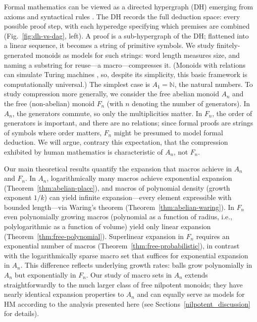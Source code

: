 \documentclass[12pt]{amsart}
\theoremstyle{definition}
\theoremstyle{remark}
\begin{document}
Formal mathematics can be viewed as a directed hypergraph (DH) emerging from axioms and syntactical rules \cite{BDF}.
The DH records the full deduction space: every possible proof step, with each hyperedge specifying which premises are combined (Fig.~\ref{fig:dh-vs-dag}, left).
A proof is a sub-hypergraph of the DH; flattened into a linear sequence, it becomes a string of primitive symbols.
We study finitely-generated monoids as models for such strings: word length measures size, and naming a substring for reuse---a macro---compresses it.
(Monoids with relations can simulate Turing machines \cite{Post}, so, despite its simplicity, this basic framework is computationally universal.)
The simplest case is $A_1 = \mathbb{N}$, the natural numbers. 
To study compression more generally, we consider the free abelian monoid $A_n$ and the free (non-abelian) monoid $F_n$ (with $n$ denoting the number of generators).
In $A_n$, the generators commute, so only the multiplicities matter.
In $F_n$, the order of generators is important, and there are no relations; since formal proofs are strings of symbols where order matters, $F_n$ might be presumed to model formal deduction.
We will argue, contrary this expectation, that the compression exhibited by human mathematics is characteristic of $A_n$, not $F_n$.

Our main theoretical results quantify the expansion that macros achieve in $A_n$ and $F_n$.
In $A_n$, logarithmically many macros achieve exponential expansion (Theorem~\ref{thm:abelian-place}), and macros of polynomial density (growth exponent $1/k$) can yield infinite expansion---every element expressible with bounded length---via Waring's theorem (Theorem~\ref{thm:abelian-waring}).
In $F_n$ even polynomially growing macros (polynomial as a function of radius, i.e., polylogarithmic as a function of volume) yield only linear expansion (Theorem~\ref{thm:free-polynomial}).
Superlinear expansion in $F_n$ requires an exponential number of macros (Theorem~\ref{thm:free-probabilistic}), in contrast with the logarithmically sparse macro set that suffices for exponential expansion in $A_n$.
This difference reflects underlying growth rates: balls grow polynomially in $A_n$ but exponentially in $F_n$.
Our study of macro sets in $A_n$ extends straightforwardly to the much larger class of free nilpotent monoids; they have nearly identical expansion properties to $A_n$ and can equally serve as models for HM according to the analysis presented here (see Sections~\ref{nilpotent_discussion} for details).
\end{document}
